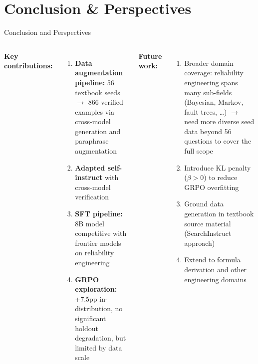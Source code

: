 \documentclass[aspectratio=169,10pt]{beamer}
\begin{document}
\section{Conclusion \& Perspectives}
\begin{frame}{Conclusion and Perspectives}
\begin{columns}[T]
\textbf{Key contributions:}
\begin{enumerate}\small
  \item \textbf{Data augmentation pipeline:} 56 textbook seeds $\to$ 866 verified examples via cross-model generation and paraphrase augmentation
  \item \textbf{Adapted self-instruct} with cross-model verification
  \item \textbf{SFT pipeline:} 8B model competitive with frontier models on reliability engineering
  \item \textbf{GRPO exploration:} +7.5pp in-distribution, no significant holdout degradation, but limited by data scale
\end{enumerate}

\textbf{Future work:}
\begin{enumerate}\small
  \item Broader domain coverage: reliability engineering spans many sub-fields (Bayesian, Markov, fault trees, \ldots) $\to$ need more diverse seed data beyond 56 questions to cover the full scope
  \item Introduce KL penalty ($\beta > 0$) to reduce GRPO overfitting
  \item Ground data generation in textbook source material (SearchInstruct approach)
  \item Extend to formula derivation and other engineering domains
\end{enumerate}
\end{columns}
\end{frame}

\end{document}
